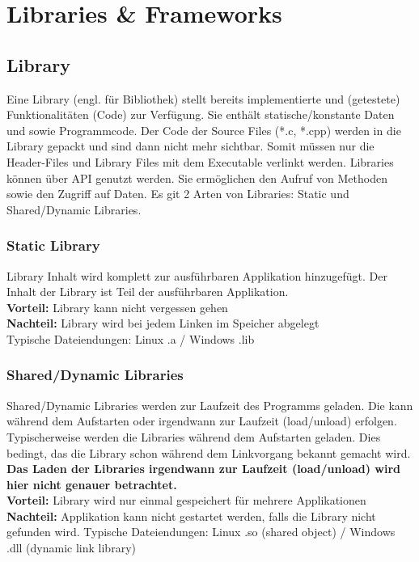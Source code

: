 \chapter{Libraries \& Frameworks}

\section{Library}
Eine Library (engl. für Bibliothek) stellt bereits implementierte und (getestete) Funktionalitäten (Code) zur Verfügung. Sie enthält statische/konstante Daten und sowie Programmcode. Der Code der Source Files (*.c, *.cpp) werden in die Library gepackt und sind dann nicht mehr sichtbar. Somit müssen nur die Header-Files und Library Files mit dem Executable verlinkt werden. Libraries können über API genutzt werden. Sie ermöglichen den Aufruf von Methoden sowie den Zugriff auf Daten. Es git 2 Arten von Libraries: Static und Shared/Dynamic Libraries. 

\subsection{Static Library}
Library Inhalt wird komplett zur ausführbaren Applikation hinzugefügt. Der Inhalt der Library ist Teil der ausführbaren Applikation. \\
\textbf{ Vorteil:} Library kann nicht vergessen gehen \\
\textbf{Nachteil:} Library wird bei jedem Linken im Speicher abgelegt \\
Typische Dateiendungen: Linux .a / Windows .lib \\

 
\subsection{Shared/Dynamic Libraries}
Shared/Dynamic Libraries werden zur Laufzeit des Programms geladen. Die kann während dem Aufstarten oder irgendwann zur Laufzeit (load/unload) erfolgen. Typischerweise werden die Libraries während dem Aufstarten geladen. Dies bedingt, das die Library schon während dem Linkvorgang bekannt gemacht wird. \textbf{Das Laden der Libraries irgendwann zur Laufzeit (load/unload) wird hier nicht genauer betrachtet.} \\
\textbf{Vorteil:} Library wird nur einmal gespeichert für mehrere Applikationen \\
\textbf{Nachteil:} Applikation kann nicht gestartet werden, falls die Library nicht gefunden wird.
 Typische Dateiendungen: Linux .so (shared object) / Windows .dll (dynamic link library) \\


